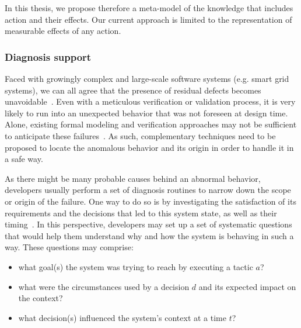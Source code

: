 In this thesis, we propose therefore a meta-model of the knowledge that includes action and their effects.
Our current approach is limited to the representation of measurable effects of any action.

\subsubsection{Diagnosis support}

Faced with growingly complex and large-scale software systems (e.g. smart grid systems), we can all agree that the presence of residual defects becomes unavoidable~\cite{DBLP:conf/icse/BarbosaLMJ17, DBLP:conf/icse/MongielloPS15, DBLP:conf/icse/HassanBB15}. 
Even with a meticulous verification or validation process, it is very likely to run into an unexpected behavior that was not foreseen at design time. Alone, existing formal modeling and verification approaches may not be sufficient to anticipate these failures~\cite{DBLP:conf/icse/TaharaOH17}. 
As such, complementary techniques need to be proposed to locate the anomalous behavior and its origin in order to handle it in a safe way.

As there might be many probable causes behind an abnormal behavior, developers usually perform a set of diagnosis routines to narrow down the scope or origin of the failure. One way to do so is by investigating the satisfaction of its requirements and the decisions that led to this system state, as well as their timing~\cite{DBLP:conf/iceccs/BencomoWSW12}.  
In this perspective, developers may set up a set of systematic questions that would help them understand why and how the system is behaving in such a way.
These questions may comprise: 
\begin{itemize}
   \item what goal(s) the system was trying to reach by executing a tactic $a$? 
   \item what were the circumstances used by a decision $d$ and its expected impact on the context?
   \item what decision(s) influenced the system's context at a time $t$? 
\end{itemize}

